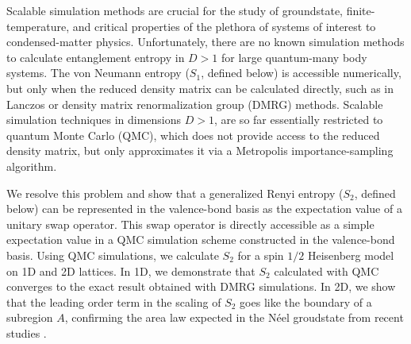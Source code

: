 \documentclass[prl,aps,twocolumn,floatfix,amsmath,amssymb,superscriptaddress,tightenlines]{revtex4}
\begin{document}
Scalable simulation methods are crucial for the 
study of groundstate, finite-temperature, and critical properties of the plethora of systems of interest to condensed-matter physics.
Unfortunately, there are 
no known simulation methods to calculate entanglement entropy in $D>1$ for large quantum-many body systems.
The von Neumann entropy ($S_1$, defined below)
is accessible numerically, but only when the reduced density matrix can be calculated directly, such as in Lanczos 
or density matrix renormalization group (DMRG) methods.  Scalable simulation techniques in dimensions $D>1$,
are so far essentially
restricted to quantum Monte Carlo (QMC), which does not provide access to the reduced density matrix, but only approximates it
via a Metropolis importance-sampling algorithm. 


We resolve this problem and show that a generalized Renyi entropy ($S_2$, defined below) can be represented in the valence-bond basis as the expectation
value of a unitary swap operator.  This swap operator is directly accessible as a simple expectation value in a QMC simulation scheme
constructed in the valence-bond basis.  Using QMC simulations, we calculate $S_2$ for a spin $1/2$ Heisenberg model
on 1D and 2D lattices.  In 1D, we demonstrate that $S_2$ calculated with QMC converges to the exact result obtained with DMRG simulations.  In 2D, we show that the leading order term in the scaling of $S_2$ goes like the boundary of a subregion $A$, 
confirming the area law expected in the N\'eel groudstate from recent studies \cite{Ann}.
\end{document}
